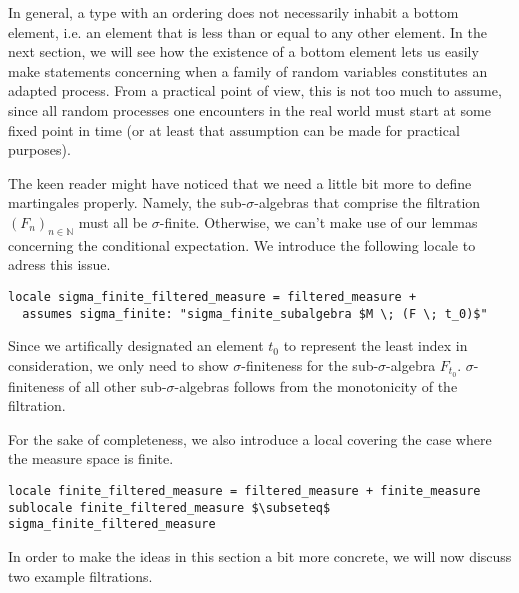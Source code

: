 In general, a type with an ordering does not necessarily inhabit a bottom element, i.e. an element that is less than or equal to any other element. In the next section, we will see how the existence of a bottom element lets us easily make statements concerning when a family of random variables constitutes an adapted process. From a practical point of view, this is not too much to assume, since all random processes one encounters in the real world must start at some fixed point in time (or at least that assumption can be made for practical purposes).

The keen reader might have noticed that we need a little bit more to define martingales properly. Namely, the sub-$\sigma$-algebras that comprise the filtration $(F_n)_{n \in \mathbb{N}}$ must all be $\sigma$-finite. Otherwise, we can't make use of our lemmas concerning the conditional expectation. We introduce the following locale to adress this issue.

\begin{isadefinition}
{\small
\begin{lstlisting}[style=isabelle]
locale sigma_finite_filtered_measure = filtered_measure +
  assumes sigma_finite: "sigma_finite_subalgebra $M \; (F \; t_0)$"
  \end{lstlisting}
}
\end{isadefinition}

\begin{remark}
	Since we artifically designated an element $t_0$ to represent the least index in consideration, we only need to show $\sigma$-finiteness for the sub-$\sigma$-algebra $F_{t_0}$. $\sigma$-finiteness of all other sub-$\sigma$-algebras follows from the monotonicity of the filtration.
\end{remark}

For the sake of completeness, we also introduce a local covering the case where the measure space is finite.

\begin{isadefinition}
{\small
\begin{lstlisting}[style=isabelle]
locale finite_filtered_measure = filtered_measure + finite_measure
sublocale finite_filtered_measure $\subseteq$ sigma_finite_filtered_measure 

  \end{lstlisting}
}
\end{isadefinition}


In order to make the ideas in this section a bit more concrete, we will now discuss two example filtrations. 

